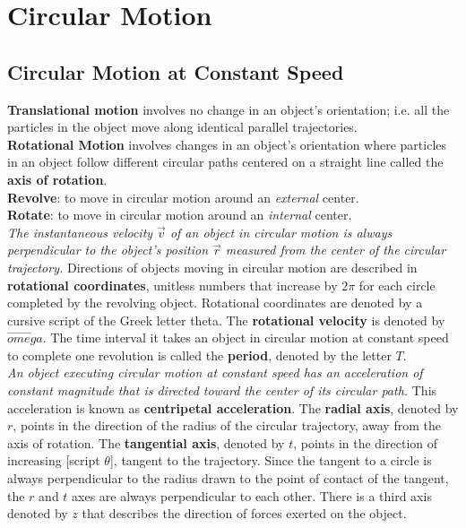 \section{Circular Motion}

    \subsection{Circular Motion at Constant Speed}

        \textbf{Translational motion} involves no change in an object's orientation; i.e. all the particles in the object move along identical parallel trajectories. \\
        \textbf{Rotational Motion} involves changes in an object's orientation where particles in an object follow different circular paths centered on a straight line called the \textbf{axis of rotation}. \\

        \textbf{Revolve}: to move in circular motion around an \textit{external} center. \\
        \textbf{Rotate}: to move in circular motion around an \textit{internal} center. \\

        \textit{The instantaneous velocity $\vec{v}$ of an object in circular motion is always perpendicular to the object's position $\vec{r}$ measured from the center of the circular trajectory.} Directions of objects
        moving in circular motion are described in \textbf{rotational coordinates}, unitless numbers that increase by $2\pi$ for each circle completed by the revolving object. Rotational coordinates are denoted by
        a cursive script of the Greek letter theta. The \textbf{rotational velocity} is denoted by $\vec{omega}$. The time interval it takes an object in circular motion at constant speed to complete one revolution is
        called the \textbf{period}, denoted by the letter $T$. \\

        \textit{An object executing circular motion at constant speed has an acceleration of constant magnitude that is directed toward the center of its circular path.} This acceleration is known as
        \textbf{centripetal acceleration}. The \textbf{radial axis}, denoted by $r$, points in the direction of the radius of the circular trajectory, away from the axis of rotation. The \textbf{tangential axis},
        denoted by $t$, points in the direction of increasing [script $\theta$], tangent to the trajectory. Since the tangent to a circle is always perpendicular to the radius drawn to the point of contact of the
        tangent, the $r$ and $t$ axes are always perpendicular to each other. There is a third axis denoted by $z$ that describes the direction of forces exerted on the object. 

